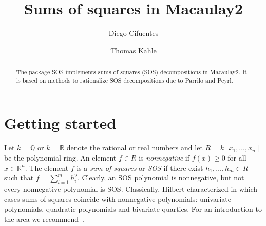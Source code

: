 \documentclass[11pt]{amsart}
\theoremstyle{plain}%
\theoremstyle{definition}
\theoremstyle{remark}
\newcommand{\SOS}{\textsc{SOS}\xspace}
\newcommand{\QQ}{\mathbb{Q}}
\newcommand{\RR}{\mathbb{R}}
\begin{document}
\title[SOS.m2]{Sums of squares in Macaulay2}

\author{Diego Cifuentes}
\address{Massachusetts Institute of Technology \\ Boston, USA}

\author{Thomas Kahle}
\address{Otto-von-Guericke University \\ Magdeburg, Germany}

\begin{abstract}
  The package \SOS implements sums of squares (SOS) decompositions in
  Macaulay2.  It is based on methods to rationalize SOS decompositions
  due to Parrilo and Peyrl.
\end{abstract}

\maketitle


\section{Getting started}

Let $k = \QQ$ or $k = \RR$ denote the rational or real numbers and let
$R = k[x_{1},\dots,x_{n}]$ be the polynomial ring.  
An element $f\in R$ is \emph{nonnegative} if $f(x) \ge 0$ for all
$x \in \RR^{n}$.  
The element $f$ is a \emph{sum of squares} or
\emph{SOS} if there exist $h_{1},\dots,h_{m} \in R$ such that
$f=\sum_{i=1}^{m}h_{i}^{2}$.  
Clearly, an SOS polynomial is nonnegative, but not every nonnegative polynomial is SOS.
Classically, Hilbert characterized in which cases sums of squares
coincide with nonnegative polynomials: univariate polynomials,
quadratic polynomials and bivariate quartics.  
For an introduction to the area we recommend~\cite{scheiderer2009positivity,blekherman2012semidefinite}.
\end{document}
